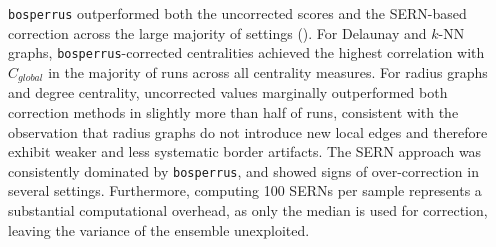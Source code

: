 \documentclass[fleqn,10pt]{olplainarticle}
\begin{document}
\texttt{bosperrus} outperformed both the uncorrected scores and the SERN-based correction across the large majority of settings (). For Delaunay and $k$-NN graphs, \texttt{bosperrus}-corrected centralities achieved the highest correlation with $C_{global}$ in the majority of runs across all centrality measures. For radius graphs and degree centrality, uncorrected values marginally outperformed both correction methods in slightly more than half of runs, consistent with the observation that radius graphs do not introduce new local edges and therefore exhibit weaker and less systematic border artifacts. The SERN approach was consistently dominated by \texttt{bosperrus}, and showed signs of over-correction in several settings. Furthermore, computing 100 SERNs per sample represents a substantial computational overhead, as only the median is used for correction, leaving the variance of the ensemble unexploited.


\end{document}
